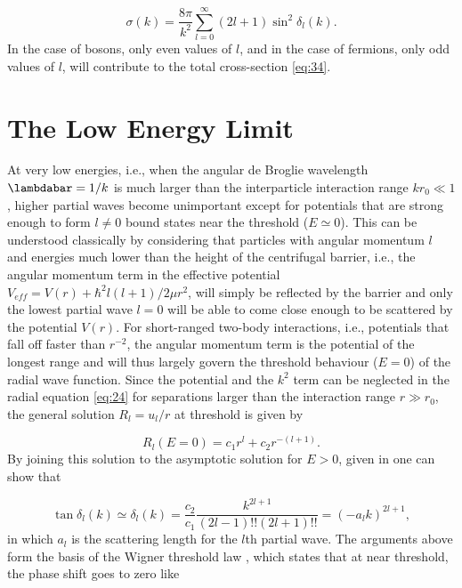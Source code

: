 \begin{equation}\label{eq:34}
\sigma(k)=
\frac{8\pi}{k^2}\sum_{l=0}^{\infty} (2l+1)\sin^2\delta_l(k). 
\end{equation}
In the case of bosons, only even values of $l$, and in the case of fermions, only odd values of $l$, will contribute to the total cross-section \eqref{eq:34}.

\section{The Low Energy Limit}
At very low energies, i.e., when the angular de Broglie wavelength $\lambdabar = 1/k$ is much larger than the interparticle interaction range $kr_0 \ll 1$, higher partial waves become unimportant except for potentials that are strong enough to form $l\neq 0$ bound states near the threshold ($E \simeq 0$). This can be understood classically by considering that particles with angular momentum $l$ and energies much lower than the height of the centrifugal barrier, i.e., the angular momentum term in the effective potential $V_{eff} = V(r) + \hbar^2l(l+1)/2\mu r^2$, will simply be reflected by the barrier and only the lowest partial wave $l=0$ will be able to come close enough to be scattered by the potential $V(r)$. For short-ranged two-body interactions, i.e., potentials that fall off faster than $r^{-2}$, the angular momentum term is the potential of the longest range and will thus largely govern the threshold behaviour ($E=0$) of the radial wave function. Since the potential and the $k^2$ term can be neglected in the radial equation \eqref{eq:24} for separations larger than the interaction range $r \gg r_0$, the general solution $R_l = u_l/r$ at threshold is given by

\begin{equation}\label{eq:35}
R_l(E=0) = c_1r^l + c_2r^{-(l+1)}.
\end{equation}
By joining this solution to the asymptotic solution for $E>0$, given in  one can show that

\begin{equation}
\tan\delta_l(k) \simeq \delta_l(k) = \frac{c_2}{c_1}\frac{k^{2l+1}}{(2l-1)!!(2l+1)!!} = (-a_lk)^{2l+1},
\end{equation}
in which $a_l$ is the scattering length for the $l$th partial wave. The arguments above form the basis of the Wigner threshold law \cite{Landau1965Quantum,Sadeghpour_2000}, which states that at near threshold, the phase shift goes to zero like

